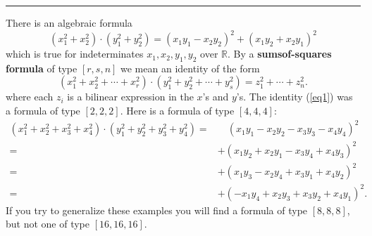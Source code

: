 \documentclass[letterpaper, 12pt]{article}
\begin{document}
\noindent\rule{7in}{2.8pt}
There is an algebraic formula 
\begin{equation}\label{eq1}
    (x_1^2+x_2^2)\cdot (y_1^2+y_2^2)=(x_1y_1-x_2y_2)^2+(x_1y_2+x_2y_1)^2
\end{equation}
which is true for indeterminates \(x_1,x_2,y_1,y_2\) over \(\mathbb{R}\). By a \textbf{sumsof-squares formula} of type \([r,s,n]\) we mean an identity of the form 
\[(x_1^2+x_2^2+\cdots+x_r^2)\cdot (y_1^2+y_2^2+\cdots+y_s^2)=z_1^2+\cdots+z_n^2.\]
where each \(z_i\) is a bilinear expression in the \(x\)'s and \(y\)'s. The identity (\ref{eq1}) was a formula of type \([2,2,2]\). Here is a formula of type \([4,4,4]\):
\begin{align*}
    (x_1^2+x_2^2+x_3^2+x_4^2)\cdot (y_1^2+y_2^2+y_3^2+y_4^2)=&\quad (x_1y_1-x_2y_2-x_3y_3-x_4y_4)^2\\ 
                                                            =&+(x_1y_2+x_2y_1-x_3y_4+x_4y_3)^2\\ 
                                                            =&+(x_1y_3-x_2y_4+x_3y_1+x_4y_2)^2\\ 
                                                            =&+(-x_1y_4+x_2y_3+x_3y_2+x_4y_1)^2.
\end{align*}
If you try to generalize these examples you will find a formula of type \([8,8,8]\), but not one of type \([16,16,16]\).
\end{document}
